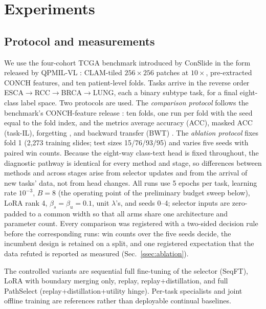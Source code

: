 \documentclass{article}
\begin{document}
\section{Experiments}
\label{sec:exp}

\subsection{Protocol and measurements}

We use the four-cohort TCGA benchmark introduced by ConSlide \cite{huang2023conslide} in the form released by QPMIL-VL \cite{gou2025qpmil}: CLAM-tiled $256\times256$ patches at $10\times$, pre-extracted CONCH features, and ten patient-level folds. Tasks arrive in the reverse order ESCA$\rightarrow$RCC$\rightarrow$BRCA$\rightarrow$LUNG, each a binary subtype task, for a final eight-class label space. Two protocols are used. The \emph{comparison protocol} follows the benchmark's CONCH-feature release \cite{gou2025qpmil}: ten folds, one run per fold with the seed equal to the fold index, and the metrics average accuracy (ACC), masked ACC (task-IL), forgetting \cite{chaudhry2018rwalk}, and backward transfer (BWT) \cite{lopezpaz2017gem}. The \emph{ablation protocol} fixes fold 1 (2,273 training slides; test sizes 15/76/93/95) and varies five seeds with paired win counts. Because the eight-way class-text head is fixed throughout, the diagnostic pathway is identical for every method and stage, so differences between methods and across stages arise from selector updates and from the arrival of new tasks' data, not from head changes.
All runs use 5 epochs per task, learning rate $10^{-3}$, $B=8$ (the operating point of the preliminary budget sweep below), LoRA rank 4, $\beta_s{=}\beta_u{=}0.1$, unit $\lambda$'s, and seeds 0--4; selector inputs are zero-padded to a common width so that all arms share one architecture and parameter count. Every comparison was registered with a two-sided decision rule before the corresponding runs: win counts over the five seeds decide, the incumbent design is retained on a split, and one registered expectation that the data refuted is reported as measured (Sec.~\ref{ssec:ablation}).

The controlled variants are sequential full fine-tuning of the selector (SeqFT), LoRA with boundary merging only, replay, replay+distillation, and full PathSelect (replay+distillation+utility hinge).
Per-task specialists and joint offline training are references rather than deployable continual baselines.
\end{document}
